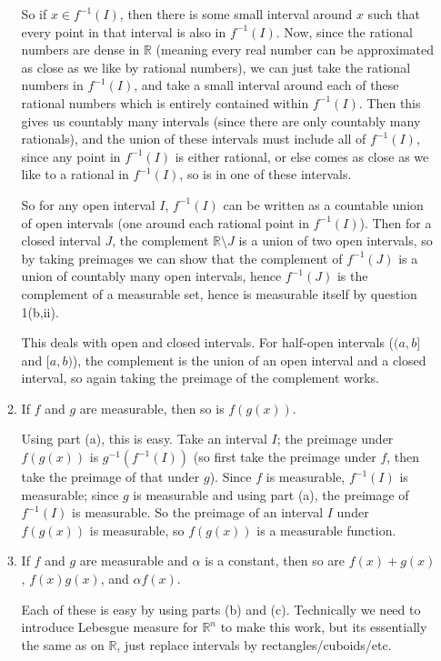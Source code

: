 \documentclass{article}
\let\take\setminus
\begin{document}
\begin{enumerate}
\begin{enumerate}
{							So if $x\in f^{-1}(I)$, then there is some small interval around $x$ such that every point in that interval is also in $f^{-1}(I)$. Now, since the rational numbers are dense in $\mathbb{R}$ (meaning every real number can be approximated as close as we like by rational numbers), we can just take the rational numbers in $f^{-1}(I)$, and take a small interval around each of these rational numbers which is entirely contained within $f^{-1}(I)$. Then this gives us countably many intervals (since there are only countably many rationals), and the union of these intervals must include all of $f^{-1}(I)$, since any point in $f^{-1}(I)$ is either rational, or else comes as close as we like to a rational in $f^{-1}(I)$, so is in one of these intervals.
							
							So for any open interval $I$, $f^{-1}(I)$ can be written as a countable union of open intervals (one around each rational point in $f^{-1}(I)$). Then for a closed interval $J$, the complement $\mathbb{R}\take J$ is a union of two open intervals, so by taking preimages we can show that the complement of $f^{-1}(J)$ is a union of countably many open intervals, hence $f^{-1}(J)$ is the complement of a measurable set, hence is measurable itself by question 1(b,ii).
							
							This deals with open and closed intervals. For half-open intervals ($(a,b]$ and $[a,b)$), the complement is the union of an open interval and a closed interval, so again taking the preimage of the complement works.
						}
			
			\item If $f$ and $g$ are measurable, then so is $f(g(x))$.
			
						{\color{blue}
							Using part (a), this is easy. Take an interval $I$; the preimage under $f(g(x))$ is $g^{-1}(f^{-1}(I))$ (so first take the preimage under $f$, then take the preimage of that under $g$). Since $f$ is measurable, $f^{-1}(I)$ is measurable; since $g$ is measurable and using part (a), the preimage of $f^{-1}(I)$ is measurable. So the preimage of an interval $I$ under $f(g(x))$ is measurable, so $f(g(x))$ is a measurable function.
						}
					
			\item If $f$ and $g$ are measurable and $\alpha$ is a constant, then so are $f(x)+g(x)$, $f(x)g(x)$, and $\alpha f(x)$.
			
						{\color{blue}
							Each of these is easy by using parts (b) and (c). Technically we need to introduce Lebesgue measure for $\mathbb{R}^n$ to make this work, but its essentially the same as on $\mathbb{R}$, just replace intervals by rectangles/cuboids/etc.
							
}
\end{enumerate}
\end{enumerate}
\end{document}
